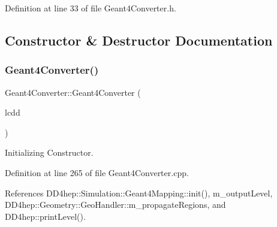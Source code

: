 Definition at line 33 of file Geant4\+Converter.\+h.



\subsection{Constructor \& Destructor Documentation}
\hypertarget{class_d_d4hep_1_1_simulation_1_1_geant4_converter_aaed2b0700c7bdbc747a7c5cf0b0e4b0e}{}\label{class_d_d4hep_1_1_simulation_1_1_geant4_converter_aaed2b0700c7bdbc747a7c5cf0b0e4b0e} 
\subsubsection{\texorpdfstring{Geant4\+Converter()}{Geant4Converter()}\hspace{0.1cm}{\footnotesize\ttfamily [1/2]}}
{\footnotesize\ttfamily Geant4\+Converter\+::\+Geant4\+Converter (\begin{DoxyParamCaption}\item[{\hyperlink{class_d_d4hep_1_1_simulation_1_1_geant4_mapping_a7b098323f9ea570a13d220fe3f09da41}{L\+C\+DD} \&}]{lcdd }\end{DoxyParamCaption})}



Initializing Constructor. 



Definition at line 265 of file Geant4\+Converter.\+cpp.



References D\+D4hep\+::\+Simulation\+::\+Geant4\+Mapping\+::init(), m\+\_\+output\+Level, D\+D4hep\+::\+Geometry\+::\+Geo\+Handler\+::m\+\_\+propagate\+Regions, and D\+D4hep\+::print\+Level().

\hypertarget{class_d_d4hep_1_1_simulation_1_1_geant4_converter_a102d0182df67257e795fde27d685b830}{}\label{class_d_d4hep_1_1_simulation_1_1_geant4_converter_a102d0182df67257e795fde27d685b830} 
